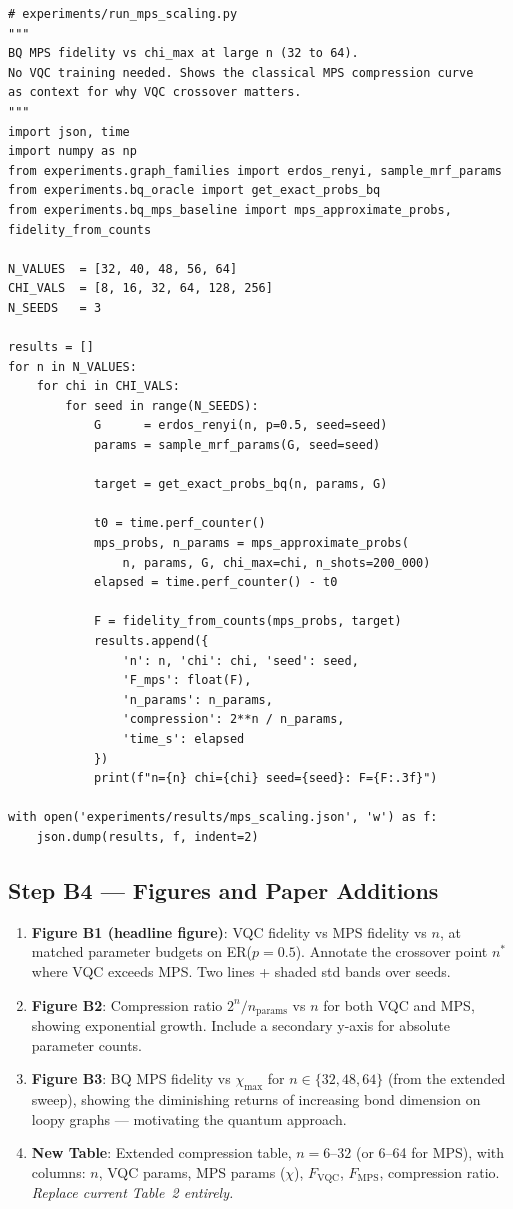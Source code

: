 \documentclass[11pt]{article}
\begin{document}
\begin{lstlisting}
# experiments/run_mps_scaling.py
"""
BQ MPS fidelity vs chi_max at large n (32 to 64).
No VQC training needed. Shows the classical MPS compression curve
as context for why VQC crossover matters.
"""
import json, time
import numpy as np
from experiments.graph_families import erdos_renyi, sample_mrf_params
from experiments.bq_oracle import get_exact_probs_bq
from experiments.bq_mps_baseline import mps_approximate_probs, fidelity_from_counts

N_VALUES  = [32, 40, 48, 56, 64]
CHI_VALS  = [8, 16, 32, 64, 128, 256]
N_SEEDS   = 3

results = []
for n in N_VALUES:
    for chi in CHI_VALS:
        for seed in range(N_SEEDS):
            G      = erdos_renyi(n, p=0.5, seed=seed)
            params = sample_mrf_params(G, seed=seed)

            target = get_exact_probs_bq(n, params, G)

            t0 = time.perf_counter()
            mps_probs, n_params = mps_approximate_probs(
                n, params, G, chi_max=chi, n_shots=200_000)
            elapsed = time.perf_counter() - t0

            F = fidelity_from_counts(mps_probs, target)
            results.append({
                'n': n, 'chi': chi, 'seed': seed,
                'F_mps': float(F),
                'n_params': n_params,
                'compression': 2**n / n_params,
                'time_s': elapsed
            })
            print(f"n={n} chi={chi} seed={seed}: F={F:.3f}")

with open('experiments/results/mps_scaling.json', 'w') as f:
    json.dump(results, f, indent=2)
\end{lstlisting}

\subsection{Step B4 --- Figures and Paper Additions}

\begin{enumerate}
  \item \textbf{Figure B1 (headline figure)}: VQC fidelity vs MPS
        fidelity vs $n$, at matched parameter budgets on ER($p=0.5$).
        Annotate the crossover point $n^*$ where VQC exceeds MPS.
        Two lines + shaded std bands over seeds.
  \item \textbf{Figure B2}: Compression ratio $2^n / n_{\text{params}}$
        vs $n$ for both VQC and MPS, showing exponential growth.
        Include a secondary y-axis for absolute parameter counts.
  \item \textbf{Figure B3}: BQ MPS fidelity vs $\chi_{\max}$ for
        $n \in \{32, 48, 64\}$ (from the extended sweep), showing
        the diminishing returns of increasing bond dimension on
        loopy graphs --- motivating the quantum approach.
  \item \textbf{New Table}: Extended compression table, $n = 6$--$32$
        (or 6--64 for MPS), with columns: $n$, VQC params, MPS params
        ($\chi$), $F_{\text{VQC}}$, $F_{\text{MPS}}$, compression ratio.
        \emph{Replace current Table~2 entirely.}
\end{enumerate}
\end{document}
